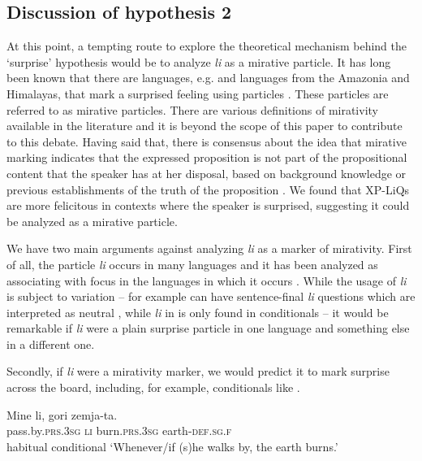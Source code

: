 \documentclass[output=paper,
colorlinks,
citecolor=brown,
newtxmath
]{langscibook}
\begin{document}
\subsection{Discussion of hypothesis 2}\label{sec:diss}
At this point, a tempting route to explore the theoretical mechanism behind the `surprise' hypothesis would be to analyze \textit{li} as a mirative particle. It has long been known that there are languages, e.g.  and languages from the Amazonia and Himalayas, that mark a surprised feeling using particles \citep{sudo2013,DeLancey2012}. These particles are referred to as mirative particles. There are various definitions of mirativity available in the literature and it is beyond the scope of this paper to contribute to this debate. Having said that, there is consensus about the idea that mirative marking indicates that the expressed proposition is not part of the propositional content that the speaker has at her disposal, based on background knowledge or previous establishments of the truth of the proposition \citep{DeLancey2012,Donabedian2001}. We found that XP-LiQs are more felicitous in contexts where the speaker is surprised, suggesting it could be analyzed as a mirative particle.

\begin{sloppypar}
We have two main arguments against analyzing \textit{li} as a marker of mirativity. %
First of all, the particle \textit{li} occurs in many  languages and it has been ana\-lyzed as associating with focus in the languages in which it occurs \citep{schwabe2004}. While the usage of \textit{li} is subject to variation -- for example  can have sentence-final \textit{li} questions which are interpreted as neutral \citep{dukova2010}, while \textit{li} in  is only found in conditionals \citep{schwabe2004} -- it would be remarkable if \textit{li} were a plain surprise particle in one  language and something else in a different one.
\end{sloppypar}

Secondly, if \textit{li} were a mirativity marker, we would predict it to mark surprise across the board, including, for example, conditionals like .


\ea \gll Mine li, gori zemja-ta. \\
pass.by.\textsc{prs.3sg} \textsc{li} burn.\textsc{prs.3sg} earth-\textsc{def.sg.f} \\ \hfill habitual conditional
\glt `Whenever/if (s)he walks by, the earth burns.'\hfill \citep[539]{koneski1987}\label{nosurprise}
\z
\end{document}
